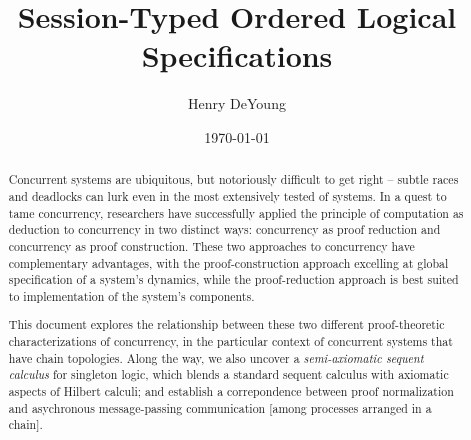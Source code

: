 \documentclass[
  tufte-book,
  notoc,
  biblatex={
    citestyle=authoryear-comp,
    autocite=footnote,
    maxcitenames=3,
    bibstyle=authoryear,
    mergedate=basic,
    maxbibnames=99,
    backref=true,
    doi=false,
    isbn=false,
  }
]{tufte-thesis}
\begin{document}
\frontmatter
\pagestyle{empty}

\title{Session-Typed Ordered Logical Specifications}

\author{Henry DeYoung}
\date{\today}





\maketitle

\pagestyle{plain}

\begin{abstract}
Concurrent systems are ubiquitous, but notoriously difficult to get right -- subtle races and deadlocks can lurk even in the most extensively tested of systems.
In a quest to tame concurrency, researchers have successfully applied the principle of computation as deduction to concurrency in two distinct ways: concurrency as proof reduction and concurrency as proof construction.
These two approaches to concurrency have complementary advantages, with the proof-construction approach excelling at global specification of a system's dynamics, while the proof-reduction approach is best suited to implementation of the system's components.

This document explores the relationship between these two different proof-theoretic characterizations of concurrency, in the particular context of concurrent systems that have chain topologies.
Along the way, we also uncover a \emph{semi-axiomatic sequent calculus} for singleton logic, which blends a standard sequent calculus with axiomatic aspects of Hilbert calculi;
and establish a correpondence between proof normalization and asychronous message-passing communication [among processes arranged in a chain].
\end{abstract}
\end{document}
